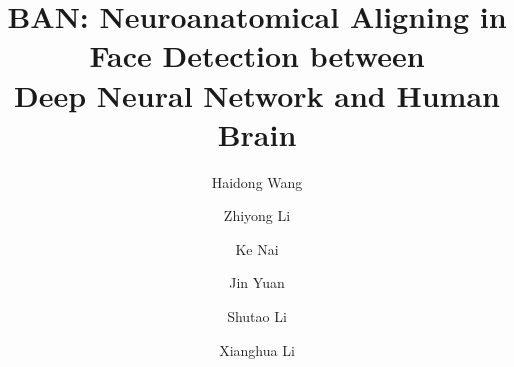 \documentclass[final,3p,times,twocolumn]{elsarticle}
\begin{document}
\begin{frontmatter}



\title{BAN: Neuroanatomical Aligning in Face Detection between \\Deep Neural Network and Human Brain}

 \author[label1]{Haidong Wang}
 \author[label1]{Zhiyong Li}
 \author[label1]{Ke Nai}
 \author[label1]{Jin Yuan}
 \author[label2]{Shutao Li}
 \author[label3]{Xianghua Li}
 \address[label1]{College of Computer Science and Electronic Engineering, Hunan University, Changsha, China}
 \address[label2]{College of Electrical and Information Engineering, Hunan University, Changsha, China}
 \address[label3]{State Grid Hunan Electric Power Company Limited Economical and Technical Research Institute, Changsha, China}

%


\end{frontmatter}
\end{document}
